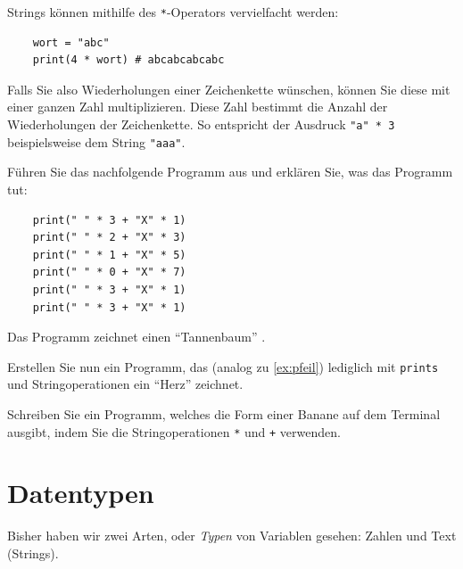 Strings können mithilfe des \lstinline{*}-Operators vervielfacht werden:
\begin{lstlisting}
	wort = "abc"
	print(4 * wort) # abcabcabcabc
\end{lstlisting}
Falls Sie also Wiederholungen einer Zeichenkette wünschen, können Sie diese mit einer ganzen Zahl multiplizieren. Diese Zahl bestimmt die Anzahl der Wiederholungen der Zeichenkette. So entspricht der Ausdruck \lstinline|"a" * 3| beispielsweise dem String \lstinline|"aaa"|.

\begin{myexercise}\label{ex:pfeil}
	Führen Sie das nachfolgende Programm aus und erklären Sie, was das Programm tut:
	\begin{lstlisting}
	print(" " * 3 + "X" * 1)
	print(" " * 2 + "X" * 3)
	print(" " * 1 + "X" * 5)
	print(" " * 0 + "X" * 7)
	print(" " * 3 + "X" * 1)
	print(" " * 3 + "X" * 1)
  \end{lstlisting}
	\begin{myanswer}
		Das Programm zeichnet einen \enquote{Tannenbaum} .
	\end{myanswer}
\end{myexercise}

\begin{myexercise}\label{ex:herz}
	Erstellen Sie nun ein Programm, das (analog zu \cref{ex:pfeil}) lediglich mit \lstinline|prints| und Stringoperationen ein \enquote{Herz}  zeichnet.
	\begin{myanswer}
		
	\end{myanswer}
\end{myexercise}

\begin{mychallenge}
	Schreiben Sie ein Programm, welches die Form einer Banane auf dem Terminal ausgibt, indem Sie die Stringoperationen \lstinline|*| und \lstinline|+| verwenden.
	\begin{myanswer}
		
	\end{myanswer}
\end{mychallenge}

\section{Datentypen}
Bisher haben wir zwei Arten, oder \emph{Typen} von Variablen gesehen: Zahlen und Text (Strings).

